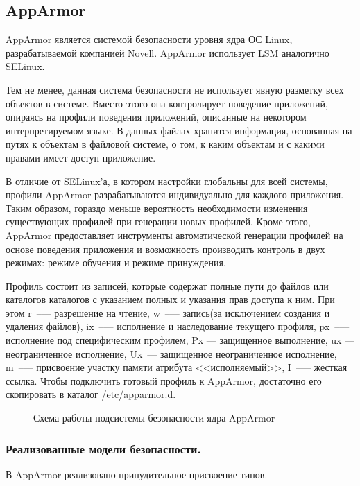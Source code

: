 \subsection{AppArmor}

AppArmor является системой безопасности уровня 
ядра ОС Linux, разрабатываемой компанией Novell. 
AppArmor использует LSM аналогично SELinux. 

Тем не менее, данная система безопасности не использует
явную разметку всех объектов в системе.
Вместо этого она контролирует поведение 
приложений, опираясь на профили поведения
приложений, описанные на некотором интерпретируемом
языке. 
В данных файлах хранится информация, основанная на 
путях к объектам в файловой системе, о том, к каким 
объектам и с какими правами имеет доступ приложение. 

В отличие от SELinux'а, 
в котором настройки глобальны для всей системы, профили 
AppArmor разрабатываются индивидуально для каждого 
приложения.
Таким образом, гораздо меньше вероятность 
необходимости изменения существующих профилей при 
генерации новых профилей. Кроме этого, 
AppArmor предоставляет инструменты 
автоматической генерации профилей на основе поведения 
приложения и возможность производить контроль в двух 
режимах: режиме обучения и режиме принуждения. 

Профиль состоит из записей, которые содержат 
полные пути до файлов или каталогов 
каталогов с указанием полных и указания прав
доступа к ним. При этом r~--— 
разрешение на чтение, w~--— запись(за исключением создания 
и удаления файлов), ix~--— исполнение и наследование текущего 
профиля, px~--— исполнение под специфическим профилем, Px — 
защищенное выполнение, ux — неограниченное исполнение, 
Ux~--- защищенное неограниченное исполнение, m~--— присвоение 
участку памяти атрибута <<исполняемый>>, I~--— жесткая ссылка. 
Чтобы подключить готовый профиль к AppArmor, достаточно его 
скопировать в каталог /etc/apparmor.d. 

\begin{figure}
\centering
\subfloat{\label{fig:apparmor}{}}
\caption{Схема работы подсистемы безопасности ядра AppArmor}
\end{figure}

\subsubsection{Реализованные модели безопасности.} 

В AppArmor реализовано принудительное присвоение типов. 

